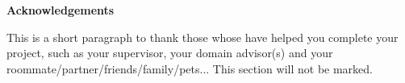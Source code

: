 \mbox{}\newline\vspace{10mm} \mbox{}\Large%
{\bf Acknowledgements} \normalsize \vspace{5mm}

This is a short paragraph to thank those whose have helped you complete your project, such as your supervisor, your domain advisor(s) and your roommate/partner/friends/family/pets... This section will not be marked.
